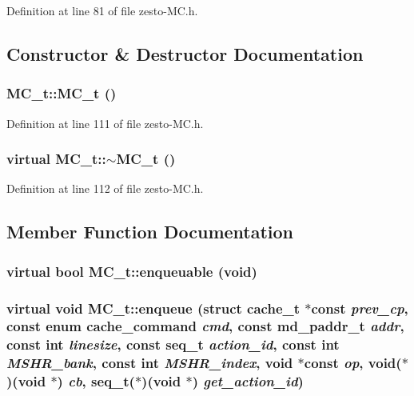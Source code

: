 Definition at line 81 of file zesto-MC.h.

\subsection{Constructor \& Destructor Documentation}
\subsubsection[{MC\_\-t}]{\setlength{\rightskip}{0pt plus 5cm}MC\_\-t::MC\_\-t ()\hspace{0.3cm}{\tt  [inline]}}\label{classMC__t_4c28cdc466215afe1e103fc23f416bd5}




Definition at line 111 of file zesto-MC.h.
\subsubsection[{$\sim$MC\_\-t}]{\setlength{\rightskip}{0pt plus 5cm}virtual MC\_\-t::$\sim$MC\_\-t ()\hspace{0.3cm}{\tt  [inline, virtual]}}\label{classMC__t_9e46771a143cb8066aa2ddd915fb4a8e}




Definition at line 112 of file zesto-MC.h.

\subsection{Member Function Documentation}
\subsubsection[{enqueuable}]{\setlength{\rightskip}{0pt plus 5cm}virtual bool MC\_\-t::enqueuable (void)\hspace{0.3cm}{\tt  [pure virtual]}}\label{classMC__t_8a5aae422f2a6cddee17f0fcaaa201e4}


\subsubsection[{enqueue}]{\setlength{\rightskip}{0pt plus 5cm}virtual void MC\_\-t::enqueue (struct {\bf cache\_\-t} $\ast$const  {\em prev\_\-cp}, \/  const enum {\bf cache\_\-command} {\em cmd}, \/  const {\bf md\_\-paddr\_\-t} {\em addr}, \/  const int {\em linesize}, \/  const {\bf seq\_\-t} {\em action\_\-id}, \/  const int {\em MSHR\_\-bank}, \/  const int {\em MSHR\_\-index}, \/  void $\ast$const  {\em op}, \/  void($\ast$)(void $\ast$) {\em cb}, \/  {\bf seq\_\-t}($\ast$)(void $\ast$) {\em get\_\-action\_\-id})\hspace{0.3cm}{\tt  [pure virtual]}}\label{classMC__t_f18cb919055f032a43b3b86665e2dfdc}


